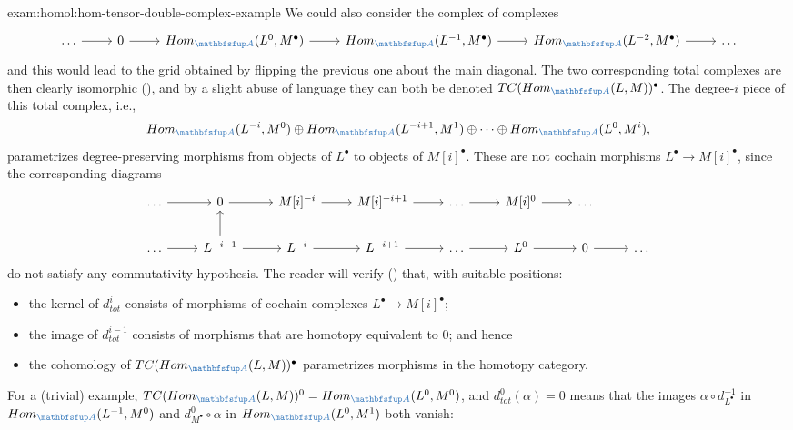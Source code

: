 \begin{exam}{}{exam:homol:hom-tensor-double-complex-example}
  We could also consider the complex of complexes
  \[\begin{tikzcd}
      \dots \arrow[r] & 0 \arrow[r] & \Hom_{\categ{A}}(L^0, M^\bullet)
      \arrow[r] & \Hom_{\categ{A}}(L^{-1}, M^\bullet) \arrow[r] &
      \Hom_{\categ{A}}(L^{-2}, M^\bullet) \arrow[r] & \dots
    \end{tikzcd}\] and this would lead to the grid obtained by
  flipping the previous one about the main diagonal. The two
  corresponding total complexes are then clearly isomorphic
  (), and
  by a slight abuse of language they can both be denoted
  $TC(\Hom_{\categ{A}}(L, M))^\bullet$. The degree-$i$ piece of this
  total complex, i.e.,
  \[
    \Hom_{\categ{A}}(L^{-i}, M^0) \oplus \Hom_{\categ{A}}(L^{-i+1},
    M^1) \oplus \dots \oplus \Hom_{\categ{A}}(L^0, M^i),
  \]
  parametrizes degree-preserving morphisms from objects of $L^\bullet$
  to objects of $M[i]^\bullet$. These are not cochain morphisms
  $L^\bullet \to M[i]^\bullet$, since the corresponding diagrams
  \[\begin{tikzcd}
      \dots \arrow[r] & 0 \arrow[r] & M[i]^{-i} \arrow[r] &
      M[i]^{-i+1} \arrow[r] & \dots \arrow[r] & M[i]^0 \arrow[r] &
      \dots \\
      \dots \arrow[r] & L^{-i-1} \arrow[r] \arrow[u] & L^{-i}
      \arrow[r] & L^{-i+1} \arrow[r] & \dots \arrow[r] & L^0 \arrow[r]
      & 0 \arrow[r] & \dots
    \end{tikzcd}\] do not satisfy any commutativity hypothesis. The
  reader will verify
  ()
  that, with suitable positions:
  \begin{itemize}
  \item the kernel of $d_{tot}^i$ consists of morphisms of cochain
    complexes $L^\bullet \to M[i]^\bullet$;
  \item the image of $d_{tot}^{i-1}$ consists of morphisms that are
    homotopy equivalent to $0$; and hence
  \item the cohomology of $TC(\Hom_{\categ{A}}(L, M))^\bullet$
    parametrizes morphisms in the homotopy category.
  \end{itemize}
  For a (trivial) example,
  $TC(\Hom_{\categ{A}}(L,M))^0 = \Hom_{\categ{A}}(L^0, M^0)$, and
  $d_{tot}^0(\alpha) = 0$ means that the images
  $\alpha \circ d_{L^\bullet}^{-1}$ in $\Hom_{\categ{A}}(L^{-1}, M^0)$
  and $d_{M^\bullet}^0 \circ \alpha$ in $\Hom_{\categ{A}}(L^0, M^1)$
  both vanish:
  \[\begin{tikzcd}[column sep=large]

\end{tikzcd}\]
\end{exam}
